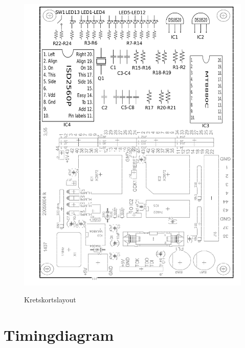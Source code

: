 \documentclass[a4paper,11pt]{article}
\begin{document}
	\begin{figure}[ht!tb]
	  \centering
	      \includegraphics[scale=0.7, angle=0]{layout.png}
		\label{fig:layout}
	  	\caption{Kretskortslayout}
	\end{figure}
	
	\section{Timingdiagram}
\end{document}
